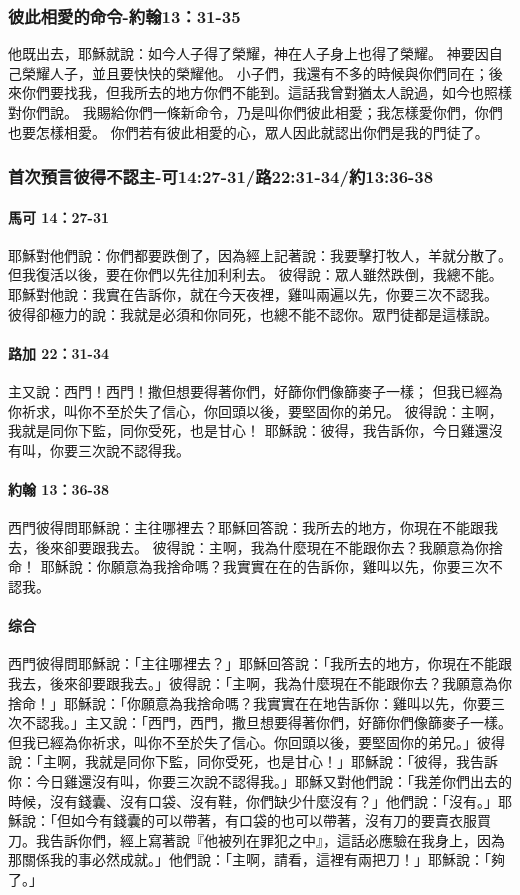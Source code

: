 \subsubsection{彼此相愛的命令-約翰13：31-35}

他既出去，耶穌就說：如今人子得了榮耀，神在人子身上也得了榮耀。
神要因自己榮耀人子，並且要快快的榮耀他。
小子們，我還有不多的時候與你們同在；後來你們要找我，但我所去的地方你們不能到。這話我曾對猶太人說過，如今也照樣對你們說。
我賜給你們一條新命令，乃是叫你們彼此相愛；我怎樣愛你們，你們也要怎樣相愛。
你們若有彼此相愛的心，眾人因此就認出你們是我的門徒了。
\subsubsection{	首次預言彼得不認主-可14:27-31/路22:31-34/約13:36-38}
\paragraph{馬可 14：27-31}
耶穌對他們說：你們都要跌倒了，因為經上記著說：我要擊打牧人，羊就分散了。
但我復活以後，要在你們以先往加利利去。
彼得說：眾人雖然跌倒，我總不能。
耶穌對他說：我實在告訴你，就在今天夜裡，雞叫兩遍以先，你要三次不認我。
彼得卻極力的說：我就是必須和你同死，也總不能不認你。眾門徒都是這樣說。
\paragraph{路加 22：31-34}
主又說：西門！西門！撒但想要得著你們，好篩你們像篩麥子一樣；
但我已經為你祈求，叫你不至於失了信心，你回頭以後，要堅固你的弟兄。
彼得說：主啊，我就是同你下監，同你受死，也是甘心！
耶穌說：彼得，我告訴你，今日雞還沒有叫，你要三次說不認得我。
\paragraph{約翰 13：36-38}
西門彼得問耶穌說：主往哪裡去？耶穌回答說：我所去的地方，你現在不能跟我去，後來卻要跟我去。
彼得說：主啊，我為什麼現在不能跟你去？我願意為你捨命！
耶穌說：你願意為我捨命嗎？我實實在在的告訴你，雞叫以先，你要三次不認我。
\paragraph{综合}
西門彼得問耶穌說：「主往哪裡去？」耶穌回答說：「我所去的地方，你現在不能跟我去，後來卻要跟我去。」彼得說：「主啊，我為什麼現在不能跟你去？我願意為你捨命！」耶穌說：「你願意為我捨命嗎？我實實在在地告訴你：雞叫以先，你要三次不認我。」主又說：「西門，西門，撒旦想要得著你們，好篩你們像篩麥子一樣。但我已經為你祈求，叫你不至於失了信心。你回頭以後，要堅固你的弟兄。」彼得說：「主啊，我就是同你下監，同你受死，也是甘心！」耶穌說：「彼得，我告訴你：今日雞還沒有叫，你要三次說不認得我。」耶穌又對他們說：「我差你們出去的時候，沒有錢囊、沒有口袋、沒有鞋，你們缺少什麼沒有？」他們說：「沒有。」耶穌說：「但如今有錢囊的可以帶著，有口袋的也可以帶著，沒有刀的要賣衣服買刀。我告訴你們，經上寫著說『他被列在罪犯之中』，這話必應驗在我身上，因為那關係我的事必然成就。」他們說：「主啊，請看，這裡有兩把刀！」耶穌說：「夠了。」


